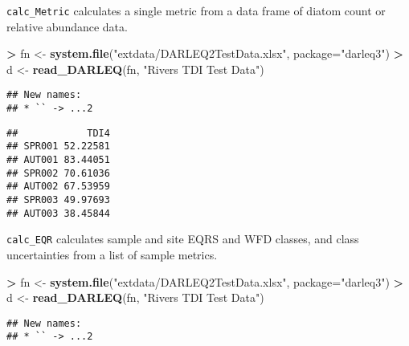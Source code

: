 \documentclass[]{article}
\newenvironment{Shaded}{\begin{snugshade}}{\end{snugshade}}
\newcommand{\KeywordTok}[1]{\textcolor[rgb]{0.13,0.29,0.53}{\textbf{#1}}}
\newcommand{\DataTypeTok}[1]{\textcolor[rgb]{0.13,0.29,0.53}{#1}}
\newcommand{\StringTok}[1]{\textcolor[rgb]{0.31,0.60,0.02}{#1}}
\newcommand{\OperatorTok}[1]{\textcolor[rgb]{0.81,0.36,0.00}{\textbf{#1}}}
\newcommand{\NormalTok}[1]{#1}
\begin{document}
\texttt{calc\_Metric} calculates a single metric from a data frame of
diatom count or relative abundance data.

\begin{Shaded}
\begin{Highlighting}[]
\OperatorTok{>}\StringTok{ }\NormalTok{fn <-}\StringTok{ }\KeywordTok{system.file}\NormalTok{(}\StringTok{"extdata/DARLEQ2TestData.xlsx"}\NormalTok{, }\DataTypeTok{package=}\StringTok{"darleq3"}\NormalTok{)}
\OperatorTok{>}\StringTok{ }\NormalTok{d <-}\StringTok{ }\KeywordTok{read_DARLEQ}\NormalTok{(fn, }\StringTok{"Rivers TDI Test Data"}\NormalTok{)}
\end{Highlighting}
\end{Shaded}

\begin{verbatim}
## New names:
## * `` -> ...2
\end{verbatim}

\begin{Shaded}
\end{Shaded}

\begin{verbatim}
##            TDI4
## SPR001 52.22581
## AUT001 83.44051
## SPR002 70.61036
## AUT002 67.53959
## SPR003 49.97693
## AUT003 38.45844
\end{verbatim}

\texttt{calc\_EQR} calculates sample and site EQRS and WFD classes, and
class uncertainties from a list of sample metrics.

\begin{Shaded}
\begin{Highlighting}[]
\OperatorTok{>}\StringTok{ }\NormalTok{fn <-}\StringTok{ }\KeywordTok{system.file}\NormalTok{(}\StringTok{"extdata/DARLEQ2TestData.xlsx"}\NormalTok{, }\DataTypeTok{package=}\StringTok{"darleq3"}\NormalTok{)}
\OperatorTok{>}\StringTok{ }\NormalTok{d <-}\StringTok{ }\KeywordTok{read_DARLEQ}\NormalTok{(fn, }\StringTok{"Rivers TDI Test Data"}\NormalTok{)}
\end{Highlighting}
\end{Shaded}

\begin{verbatim}
## New names:
## * `` -> ...2
\end{verbatim}
\end{document}
